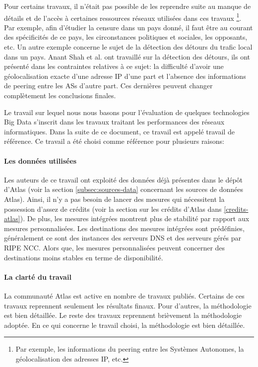 Pour certains travaux, il n'était pas possible  de les reprendre suite au manque de détails et de l'accès à  certaines ressources réseaux utilisées dans ces travaux \footnote{Par exemple, les informations du peering entre les Systèmes Autonomes, la géolocalisation des adresses IP, etc.}. Par exemple, afin d'étudier la censure dans un pays donné, il faut être au courant des spécificités de ce pays, les circonstances politiques et sociales, les opposants,  etc.  Un autre exemple concerne le sujet de la détection des détours du trafic local dans un pays.  Anant Shah  et al. ont travaillé sur la détection des détours, ils ont présenté dans  \cite{anant-shah} les contraintes relatives à ce sujet: la difficulté d'avoir une géolocalisation exacte d'une adresse IP d'une part et l'absence des informations de peering entre les ASs d'autre part. Ces dernières peuvent changer complètement les conclusions finales. 

Le travail sur lequel nous nous basons \cite{DBLP:journals/corr/FontugneAPB16} pour l'évaluation de quelques technologies Big Data s'inscrit dans les travaux traitant les performances des réseaux informatiques. Dans la suite de ce document, ce travail est appelé  travail de référence.  Ce travail a été choisi comme référence pour plusieurs raisons:



\paragraph{Les données utilisées}  Les auteurs de ce travail ont exploité des données déjà présentes dans le dépôt d'Atlas (voir la section \ref{subsec:sources-data} concernant les sources de données Atlas). Ainsi, il n'y a pas besoin de lancer des mesures qui nécessitent la possession d'assez de crédits (voir la section sur les crédits d'Atlas dans \ref{credits-atlas}). De plus, les mesures intégrées montrent plus de stabilité par rapport aux mesures personnalisées. Les destinations des mesures intégrées sont prédéfinies, généralement ce sont des instances des serveurs DNS et des serveurs gérés par  RIPE NCC. Alors que, les mesures personnalisées peuvent concerner des destinations moins stables en terme de disponibilité.

\paragraph{La clarté du travail} La communauté  Atlas est active en nombre de travaux publiés.   Certains de ces travaux reprennent seulement les résultats finaux. Pour d'autres,  la méthodologie est bien détaillée. Le reste des travaux reprennent brièvement la méthodologie adoptée. En ce qui concerne le  travail choisi, la méthodologie est bien détaillée.

